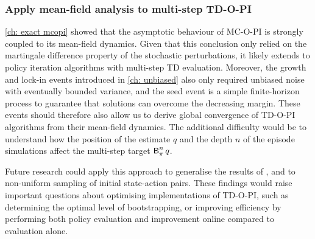\subsubsection{Apply mean-field analysis to multi-step TD-O-PI}
\vspace{-0.2cm}


\autoref{ch: exact mcopi} showed that the asymptotic behaviour of MC-O-PI is strongly coupled to its mean-field dynamics.
Given that this conclusion only relied on the martingale difference property of the stochastic perturbations, it likely extends to policy iteration algorithms with multi-step TD evaluation.
Moreover, the growth and lock-in events introduced in \autoref{ch: unbiased} also only required unbiased noise with eventually bounded variance, and the seed event is a simple finite-horizon process to guarantee that solutions can overcome the decreasing margin.
These events should therefore also allow us to derive global convergence of TD-O-PI algorithms from their mean-field dynamics.
The additional difficulty would be to understand how
the position of the estimate $q$ and the depth $n$ of the episode simulations affect the multi-step target $\operatorname{\mathsf{B}}_{\pi}^n q$.




\vspace{-0.1cm}


Future research could apply this approach 
to generalise the results of \citet{Tsitsiklis2002OnIteration}, \citet{Harutyunyan2016QCorrections}
and \citet{Munos2016SafeLearning} to
non-uniform sampling of initial state-action pairs.
These findings would raise important questions about optimising implementations of TD-O-PI,
such as determining the optimal level of bootstrapping,
or improving efficiency by performing both policy evaluation and improvement online compared to evaluation alone.




